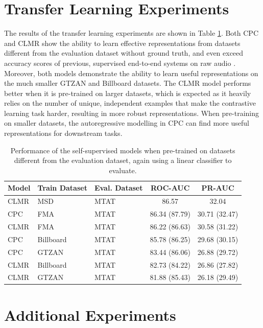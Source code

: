 \section{Transfer Learning Experiments}
The results of the transfer learning experiments are shown in Table \ref{tab:magnatagatune_results}.
Both CPC and CLMR show the ability to learn effective representations from datasets different from the evaluation dataset without ground truth, and even exceed accuracy scores of previous, supervised end-to-end systems on raw audio \cite{dieleman2014end}.
Moreover, both models demonstrate the ability to learn useful representations on the much smaller GTZAN and Billboard datasets.
The CLMR model performs better when it is pre-trained on larger datasets, which is expected as it heavily relies on the number of unique, independent examples that make the contrastive learning task harder, resulting in more robust representations.
When pre-training on smaller datasets, the autoregressive modelling in CPC can find more useful representations for downstream tasks.

\begin{table}[h]
    \centering
    \begin{tabular}{@{}lllcc@{}}\toprule
        Model & Train Dataset & Eval.
        Dataset &  ROC-AUC & PR-AUC \\ \midrule
        CLMR & MSD & MTAT &  86.57 & 32.04 \\
        CPC & FMA & MTAT & 86.34 (87.79) & 30.71 (32.47) \\
        CLMR & FMA & MTAT & 86.22 (86.63) & 30.58 (31.22) \\
        CPC & Billboard & MTAT & 85.78 (86.25) & 29.68 (30.15) \\
        CPC & GTZAN & MTAT & 83.44 (86.06) & 26.88 (29.72) \\
        CLMR & Billboard & MTAT & 82.73 (84.22) & 26.86 (27.82) \\
        CLMR & GTZAN & MTAT & 81.88 (85.43) & 26.18 (29.49) \\
        \bottomrule
    \end{tabular}
    \caption{Performance of the self-supervised models when pre-trained on datasets different from the evaluation dataset, again using a linear classifier to evaluate.}
    \label{tab:magnatagatune_results}
\end{table}

\newpage

\section{Additional Experiments}\label{sec:additional_experiments}
